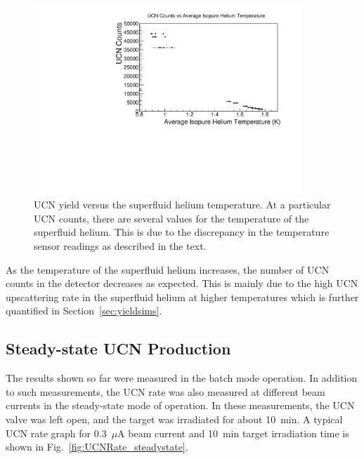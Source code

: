 \begin{figure}[h!]
  \centering
  \includegraphics[width=0.9\textwidth]{counts_vs_temp.pdf}
  \caption[UCN yield versus the superfluid helium temperature]{UCN
    yield versus the superfluid helium temperature. At a particular
    UCN counts, there are several values for the temperature of the
    superfluid helium. This is due to the discrepancy in the
    temperature sensor readings as described in the text.}
  \label{fig:counts_vs_temp}
\end{figure}

As the temperature of the superfluid helium increases, the number of
UCN counts in the detector decreases as expected. This is mainly due
to the high UCN upscattering rate in the superfluid helium at higher
temperatures which is further quantified in
Section~\ref{sec:yieldsims}.


\subsection{Steady-state UCN Production\label{sec:steadystate}}

The results shown so far were measured in the batch mode operation. In
addition to such measurements, the UCN rate was also measured at
different beam currents in the steady-state mode of operation. In
these measurements, the UCN valve was left open, and the target was
irradiated for about 10~min. A typical UCN rate graph for 0.3~$\mu$A
beam current and 10~min target irradiation time is shown in
Fig.~\ref{fig:UCNRate_steadystate}.


